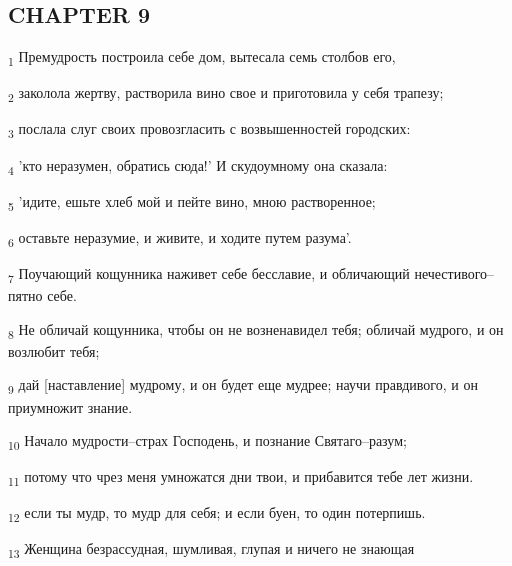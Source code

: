 \subsection{CHAPTER 9}
\begin{tcolorbox}
\textsubscript{1} Премудрость построила себе дом, вытесала семь столбов его,
\end{tcolorbox}
\begin{tcolorbox}
\textsubscript{2} заколола жертву, растворила вино свое и приготовила у себя трапезу;
\end{tcolorbox}
\begin{tcolorbox}
\textsubscript{3} послала слуг своих провозгласить с возвышенностей городских:
\end{tcolorbox}
\begin{tcolorbox}
\textsubscript{4} 'кто неразумен, обратись сюда!' И скудоумному она сказала:
\end{tcolorbox}
\begin{tcolorbox}
\textsubscript{5} 'идите, ешьте хлеб мой и пейте вино, мною растворенное;
\end{tcolorbox}
\begin{tcolorbox}
\textsubscript{6} оставьте неразумие, и живите, и ходите путем разума'.
\end{tcolorbox}
\begin{tcolorbox}
\textsubscript{7} Поучающий кощунника наживет себе бесславие, и обличающий нечестивого--пятно себе.
\end{tcolorbox}
\begin{tcolorbox}
\textsubscript{8} Не обличай кощунника, чтобы он не возненавидел тебя; обличай мудрого, и он возлюбит тебя;
\end{tcolorbox}
\begin{tcolorbox}
\textsubscript{9} дай [наставление] мудрому, и он будет еще мудрее; научи правдивого, и он приумножит знание.
\end{tcolorbox}
\begin{tcolorbox}
\textsubscript{10} Начало мудрости--страх Господень, и познание Святаго--разум;
\end{tcolorbox}
\begin{tcolorbox}
\textsubscript{11} потому что чрез меня умножатся дни твои, и прибавится тебе лет жизни.
\end{tcolorbox}
\begin{tcolorbox}
\textsubscript{12} если ты мудр, то мудр для себя; и если буен, то один потерпишь.
\end{tcolorbox}
\begin{tcolorbox}
\textsubscript{13} Женщина безрассудная, шумливая, глупая и ничего не знающая
\end{tcolorbox}
